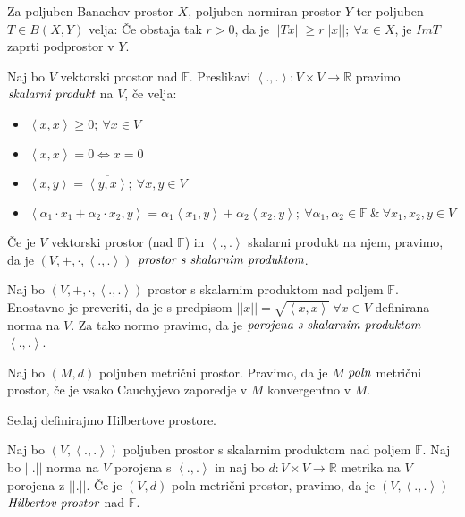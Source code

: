\documentclass[mat2]{matdelo}
\newcommand{\R}{\mathbb{R}}
\newcommand{\F}{\mathbb{F}}
\newcommand{\abs}[1]{\ensuremath{\lvert #1 \rvert}}
\newcommand{\norm}[1]{\abs{\abs{#1}}}
\newcommand{\pojem}[1]{\ensuremath{\emph{#1}}}
\newcommand{\Sp}[2]{\ensuremath{\left<#1, #2\right>}}
\newcommand{\map}[3]{\ensuremath{{#1}:{#2}\rightarrow{#3}}}
\begin{document}
		\begin{lema}
			\label{lem:banzap}
			Za poljuben Banachov prostor $X$, poljuben normiran prostor $Y$ ter poljuben $T\in B(X, Y)$ velja: Če obstaja tak $r>0$, da je $\norm{Tx}\geq r\norm{x};~\forall x\in X$, je $ImT$ zaprti podprostor v $Y$.
		\end{lema}
		
		\begin{definicija}
			\label{def:ScalProd}
			Naj bo $V$ vektorski prostor nad $\F$. Preslikavi $\map{\Sp{.}{.}}{V\times V}{\R}$ pravimo \pojem{skalarni produkt} na $V$, če velja: \begin{itemize}
				\item $\Sp{x}{x} \geq 0;~\forall x\in V$
				\item $\Sp{x}{x} = 0 \iff x = 0$
				\item $\Sp{x}{y} = \overline{\Sp{y}{x}};~\forall x, y\in V$
				\item $\Sp{\alpha_1\cdot x_1 + \alpha_2\cdot x_2}{y} = \alpha_1\Sp{x_1}{y} +\alpha_2\Sp{x_2}{y};~\forall \alpha_1, \alpha_2\in\F~\&~\forall x_1, x_2, y\in V$
			\end{itemize}
			Če je $V$ vektorski prostor (nad $\F$) in $\Sp{.}{.}$ skalarni produkt na njem, pravimo, da je $(V, +, \cdot, \Sp{.}{.})$ \pojem{prostor s skalarnim produktom}.
		\end{definicija}
		
		\begin{opomba}
			\label{op:ScalProd}
			Naj bo $(V, +, \cdot, \Sp{.}{.})$ prostor s skalarnim produktom nad poljem $\F$. Enostavno je preveriti, da je s predpisom $\norm{x} = \sqrt{\Sp{x}{x}}~\forall x\in V$ definirana norma na $V$. Za tako normo pravimo, da je \pojem{porojena s skalarnim produktom} $\Sp{.}{.}$.
		\end{opomba}
		\begin{definicija}
			\label{def:PolnMP}
			Naj bo $(M, d)$ poljuben metrični prostor. Pravimo, da je $M$ \pojem{poln} metrični prostor, če je vsako Cauchyjevo zaporedje v $M$ konvergentno v $M$.
		\end{definicija}
		Sedaj definirajmo Hilbertove prostore.
		\begin{definicija}
			\label{def:Hilbert}
			Naj bo $(V, \Sp{.}{.})$ poljuben prostor s skalarnim produktom nad poljem $\F$. Naj bo $\norm{.}$ norma na $V$ porojena s $\Sp{.}{.}$ in naj bo $\map{d}{V\times V}{\R}$ metrika na $V$ porojena z $\norm{.}$. Če je $(V, d)$ poln metrični prostor, pravimo, da je $(V, \Sp{.}{.})$ \pojem{Hilbertov prostor} nad $\F$. 
		\end{definicija}
		
\end{document}
